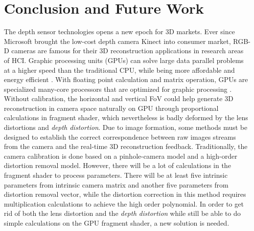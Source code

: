 \chapter{Conclusion and Future Work} %
\label{chapterConclusionAndFutureWork} 
\indent
The depth sensor technologies opens a new epoch for 3D markets. Ever since Microsoft brought the low-cost depth camera Kinect into consumer market, RGB-D cameras are famous for their 3D reconstruction applications in research areas of HCI. Graphic processing units (GPUs) can solve large data parallel problems at a higher speed than the traditional CPU, while being more affordable and energy efficient \cite{GPUadvantage_2015}. With floating point calculation and matrix operation, GPUs are specialized many-core processors that are optimized for graphic processing \cite{GPUadvantage02_2013}. Without calibration, the horizontal and vertical FoV could help generate 3D reconstruction in camera space naturally on GPU through proportional calculations in fragment shader, which nevertheless is badly deformed by the lens distortions and \emph{depth distortion}. Due to image formation, some methods must be designed to establish the correct correspondence between raw images streams from the camera and the real-time 3D reconstruction feedback. Traditionally, the camera calibration is done based on a pinhole-camera model and a high-order distortion removal model. However, there will be a lot of calculations in the fragment shader to process parameters. There will be at least five intrinsic parameters from intrinsic camera matrix and another five parameters from distortion removal vector, while the distortion correction in this method requires multiplication calculations to achieve the high order polynomial. In order to get rid of both the lens distortion and the \emph{depth distortion} while still be able to do simple calculations on the GPU fragment shader, a new solution is needed.

